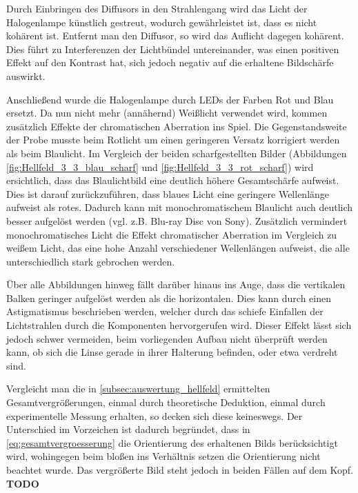 \documentclass[ngerman]{scrartcl}
\begin{document}
Durch Einbringen des Diffusors in den Strahlengang wird das Licht der Halogenlampe künstlich gestreut, wodurch gewährleistet ist, dass es nicht kohärent ist. Entfernt man den Diffusor, so wird das Auflicht dagegen kohärent. Dies führt zu Interferenzen der Lichtbündel untereinander, was einen positiven Effekt auf den Kontrast hat, sich jedoch negativ auf die erhaltene Bildschärfe auswirkt.

Anschließend wurde die Halogenlampe durch LEDs der Farben Rot und Blau ersetzt. Da nun nicht mehr (annähernd) Weißlicht verwendet wird, kommen zusätzlich Effekte der chromatischen Aberration ins Spiel. Die Gegenstandsweite der Probe musste beim Rotlicht um einen geringeren Versatz korrigiert werden als beim Blaulicht. Im Vergleich der beiden scharfgestellten Bilder (Abbildungen \ref{fig:Hellfeld_3_3_blau_scharf} und \ref{fig:Hellfeld_3_3_rot_scharf}) wird ersichtlich, dass das Blaulichtbild eine deutlich höhere Gesamtschärfe aufweist. Dies ist darauf zurückzuführen, dass blaues Licht eine geringere Wellenlänge aufweist als rotes. Dadurch kann mit monochromatischem Blaulicht auch deutlich besser aufgelöst werden (vgl. z.B. Blu-ray Disc von Sony). Zusätzlich vermindert monochromatisches Licht die Effekt chromatischer Aberration im Vergleich zu weißem Licht, das eine hohe Anzahl verschiedener Wellenlängen aufweist, die alle unterschiedlich stark gebrochen werden.

Über alle Abbildungen hinweg fällt darüber hinaus ins Auge, dass die vertikalen Balken geringer aufgelöst werden als
die horizontalen. Dies kann durch einen Astigmatismus beschrieben werden, welcher
durch das schiefe Einfallen der Lichtstrahlen durch die Komponenten hervorgerufen wird. Dieser Effekt lässt
sich jedoch schwer vermeiden, beim vorliegenden Aufbau nicht überprüft werden kann, ob sich die Linse gerade in ihrer Halterung befinden, oder etwa verdreht sind.

Vergleicht man die in \autoref{subsec:auswertung_hellfeld} ermittelten Gesamtvergrößerungen, einmal durch theoretische Deduktion, einmal durch experimentelle Messung erhalten, so decken sich diese keineswegs. Der Unterschied im Vorzeichen ist dadurch begründet, dass in \autoref{eq:gesamtvergroesserung} die Orientierung des erhaltenen Bilds berücksichtigt wird, wohingegen beim bloßen ins Verhältnis setzen die Orientierung nicht beachtet wurde. Das vergrößerte Bild steht jedoch in beiden Fällen auf dem Kopf.
\newline\textbf{TODO}
\end{document}
